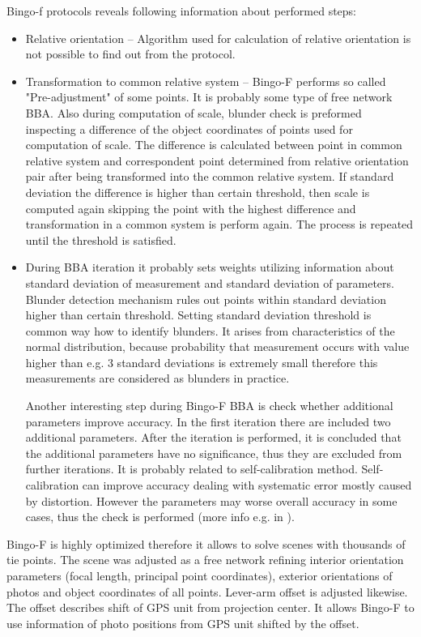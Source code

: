 \documentclass[a4paper,12pt]{article}
\begin{document}
Bingo-f protocols reveals following information about performed steps: 
\begin{itemize}
\item Relative orientation -- Algorithm used for calculation of relative orientation is not possible to find out from the protocol.  
\item Transformation to common relative system -- Bingo-F performs so called "Pre-adjustment" of some points. It is probably some type of free network 
BBA. Also during computation of scale, blunder check is preformed inspecting a difference of the object coordinates of points 
used for computation of scale. The difference is calculated between point in common relative system 
and correspondent point determined from relative orientation pair after being transformed into the common relative system.
If standard deviation the difference is higher than certain threshold, then 
scale is computed again skipping the point with the highest difference and 
transformation in a common system is perform again.
The process is repeated  until  the threshold is satisfied.
\item During BBA iteration it probably sets weights utilizing information about standard deviation of measurement 
and standard deviation of parameters. 
Blunder detection mechanism rules out points within
standard deviation higher than certain threshold. Setting standard deviation threshold  is common way how to identify 
blunders. It arises from characteristics of the normal distribution, because probability that measurement occurs with value 
 higher than e.g. 3 standard deviations is extremely small therefore this measurements are considered as blunders in practice.
 
 Another interesting step during Bingo-F BBA is check whether additional parameters improve accuracy. 
 In the first iteration there are included two additional parameters. After 
 the iteration is performed, it is concluded that the additional parameters have no significance, thus 
 they are excluded from further iterations. It is probably related to self-calibration 
 method. Self-calibration can improve accuracy dealing with systematic error mostly caused by 
 distortion. However the parameters may worse overall accuracy in some cases, thus 
  the check is performed (more info e.g. in \cite{precision1980grunn}).
\end{itemize}

Bingo-F is highly optimized therefore it allows to solve scenes with thousands of tie points.
The scene was adjusted as a free network refining interior orientation parameters (focal length, principal point coordinates),
exterior orientations of photos and object coordinates of all points. Lever-arm offset is adjusted likewise.
The offset describes 
shift of GPS unit from projection center.  
It allows Bingo-F to use information of photo positions from GPS unit shifted by the offset.  
\end{document}
